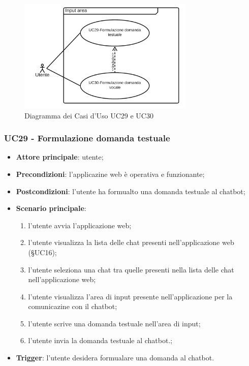 \documentclass[10pt, a4paper]{article}
\begin{document}
    \begin{figure}[h]
        \centering
        \includegraphics[width=0.75\textwidth, height=0.75\textheight, keepaspectratio]{UC-images/UC29-UC30.png}
        \caption{Diagramma dei Casi d'Uso UC29 e UC30}
    \end{figure}

    \subsubsection{UC29 - Formulazione domanda testuale}
    \begin{itemize}
        \item \textbf{Attore principale}: utente;
        \item \textbf{Precondizioni}: l'applicazine web è operativa e funzionante;
        \item \textbf{Postcondizioni}: l'utente ha formualto una domanda testuale al chatbot;
        \item \textbf{Scenario principale}:
            \begin{enumerate}
                \item l'utente avvia l'applicazione web;
                \item l'utente visualizza la lista delle chat presenti nell'applicazione web (\S UC16);
                \item l'utente seleziona una chat tra quelle presenti nella lista delle chat nell'applicazione web;
                \item l'utente visualizza l'area di input presente nell'applicazione per la comunicazine con il chatbot;
                \item l'utente scrive una domanda testuale nell'area di input;
                \item l'utente invia la domanda testuale al chatbot.;
            \end{enumerate}
        \item \textbf{Trigger}: l'utente desidera formualare una domanda al chatbot.
    \end{itemize}
\end{document}
